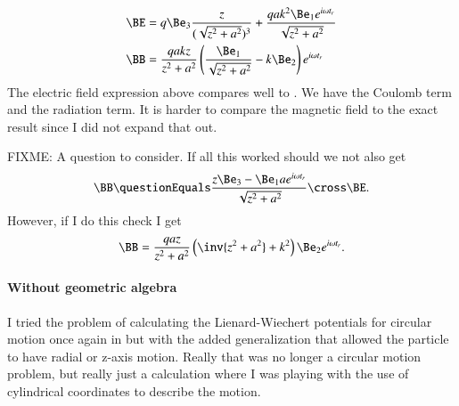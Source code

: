 {\begin{equation}
\begin{aligned}
\BE &=
q \Be_3 \frac{z}{(\sqrt{z^2 + a^2})^3}
+
\frac{q a k^2 \Be_1 e^{i \omega t_r} }{\sqrt{z^2 + a^2}} \\
\BB
&= \frac{q a k z}{ z^2 + a^2} \left( \frac{\Be_1}{\sqrt{z^2 + a^2}} - k \Be_2 \right) e^{i \omega t_r}
\end{aligned}
\end{equation}
%
The electric field expression above compares well to .  We have the Coulomb term and the radiation term.  It is harder to compare the magnetic field to the exact result  since I did not expand that out.

FIXME: A question to consider.  If all this worked should we not also get
%
\begin{equation}\label{eqn:relativisticElectrodynamicsExamReflection:270}
\BB
\questionEquals
\frac{z \Be_3 - \Be_1 a e^{i \omega t_r}}{\sqrt{z^2 + a^2}} \cross \BE.
\end{equation}
%
However, if I do this check I get
%
\begin{equation}\label{eqn:relativisticElectrodynamicsExamReflection:290}
\BB
=
\frac{q a z}{z^2 + a^2} \left( \inv{z^2 + a^2} + k^2 \right) \Be_2 e^{i \omega t_r}.
\end{equation}
%
%
\paragraph{Without geometric algebra}
%
I tried the problem of calculating the Lienard-Wiechert potentials for circular motion once again in \citep{gabookII:matrixVectorPotentials} but with the added generalization that allowed the particle to have radial or z-axis motion.  Really that was no longer a circular motion problem, but really just a calculation where I was playing with the use of cylindrical coordinates to describe the motion.

}
